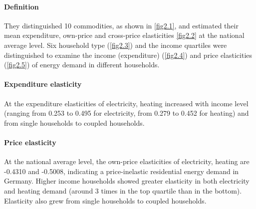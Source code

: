 \paragraph{Definition\\}{They distinguished 10 commodities, as shown in \cref{fig2.1}, and estimated their mean expenditure, own-price and cross-price elasticities \cref{fig2.2} at the national average level. Six household type (\cref{fig2.3}) and the income quartiles were distinguished to examine the income (expenditure) (\cref{fig2.4}) and price elasticities (\cref{fig2.5}) of energy demand in different households. }

\paragraph{Expenditure elasticity\\}{At the expenditure elasticities of electricity, heating increased with income level (ranging from 0.253 to 0.495 for electricity, from 0.279 to 0.452 for heating) and from single households to coupled households.  
}

\paragraph{Price elasticity\\}{At the national average level, the own-price elasticities of electricity, heating are -0.4310 and -0.5008, indicating a price-inelastic residential energy demand in Germany. Higher income households showed greater elasticity in both electricity and heating demand (around 3 times in the top quartile than in the bottom). Elasticity also grew from single households to coupled households.
}

